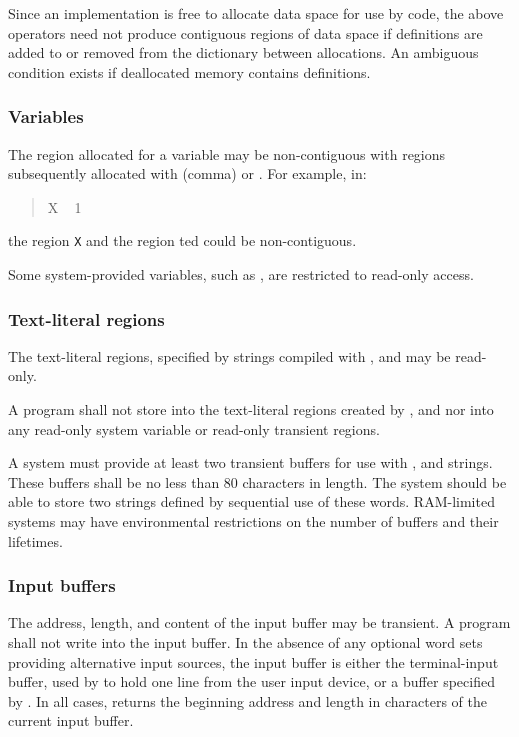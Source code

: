 Since an implementation is free to allocate data space for use by
code, the above operators need not produce contiguous regions of
data space if definitions are added to or removed from the
dictionary between allocations. An ambiguous condition exists if
deallocated memory contains definitions.


\subsubsection{Variables} %
\label{usage:var}

The region allocated for a variable may be non-contiguous with
regions subsequently allocated with \linebreak \word{,} (comma) or
. For example, in:
\begin{quote}
	 X ~ 1  
\end{quote}
the region \texttt{X} and the region ted could be
non-contiguous.

Some system-provided variables, such as , are
restricted to read-only access.


\subsubsection{Text-literal regions} %
\label{usage:"literal}

The text-literal regions, specified by strings compiled with
,  and  may be read-only.

A program shall not store into the text-literal regions created
by ,  and  nor into any read-only
system variable or read-only transient regions.

A system must provide at least two transient buffers for use with
,  and  strings. These buffers shall
be no less than 80 characters in length.
The system should be able to store two strings defined by sequential
use of these words.
RAM-limited systems may have environmental restrictions on the number
of buffers and their lifetimes.

\subsubsection{Input buffers} %
\label{usage:inbuf}

The address, length, and content of the input buffer may be
transient. A program shall not write into the input buffer. In the
absence of any optional word sets providing alternative input
sources, the input buffer is either the terminal-input buffer, used
by  to hold one line from the user input device, or a
buffer specified by . In all cases, 
returns the beginning address and length in characters of the
current input buffer.

